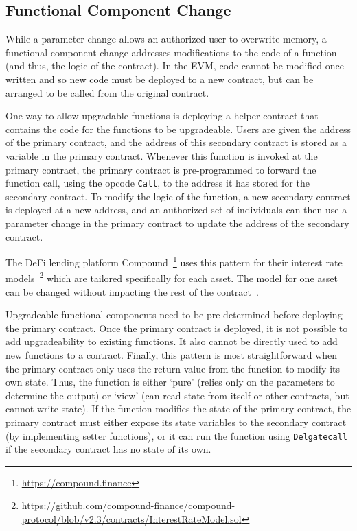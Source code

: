 
\subsection{Functional Component Change}
\label{sec:component}

While a parameter change allows an authorized user to overwrite memory, a functional component change addresses modifications to the code of a function (and thus, the logic of the contract). In the EVM, code cannot be modified once written and so new code must be deployed to a new contract, but can be arranged to be called from the original contract. 

One way to allow upgradable functions is deploying a helper contract that contains the code for the functions to be upgradeable. Users are given the address of the primary contract, and the address of this secondary contract is stored as a variable in the primary contract. Whenever this function is invoked at the primary contract, the primary contract is pre-programmed to forward the function call, using the opcode \texttt{Call}, to the address it has stored for the secondary contract. To modify the logic of the function, a new secondary contract is deployed at a new address, and an authorized set of individuals can then use a parameter change in the primary contract to update the address of the secondary contract.

The DeFi lending platform Compound~\footnote{\url{https://compound.finance}} uses this pattern for their interest rate models~\footnote{\url{https://github.com/compound-finance/compound-protocol/blob/v2.3/contracts/InterestRateModel.sol}} which are tailored specifically for each asset. The model for one asset can be changed without impacting the rest of the contract~\cite{openzeppelinPost}.

Upgradeable functional components need to be pre-determined before deploying the primary contract. Once the primary contract is deployed, it is not possible to add upgradeability to existing functions. It also cannot be directly used to add new functions to a contract. Finally, this pattern is most straightforward when the primary contract only uses the return value from the function to modify its own state. Thus, the function is either `pure' (relies only on the parameters to determine the output) or `view' (can read state from itself or other contracts, but cannot write state). If the function modifies the state of the primary contract, the primary contract must either expose its state variables to the secondary contract (by implementing setter functions), or it can run the function using \texttt{Delgatecall} if the secondary contract has no state of its own. 

